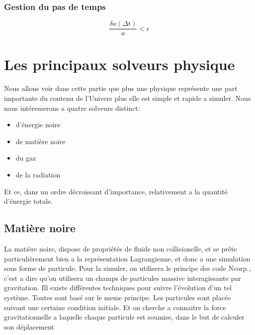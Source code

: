 \subsection{Gestion du pas de temps}


\begin{equation}
\frac{\delta a (\Delta t) } {a} < \epsilon
\end{equation}


\chapter{Les principaux solveurs physique}

Nous allons voir dans cette partie que plus une physique représente une part importante du contenu de l'Univers plus elle est simple et rapide a simuler.
Nous nous intéresserons a quatre solveurs distinct:
\begin{itemize}
\item d'énergie noire
\item de matière noire
\item du gaz
\item de la radiation
\end{itemize}
Et ce, dans un ordre décroissant d'importance, relativement a la quantité d'énergie totale.





\section{Matière noire}
\label{sec:solverDM}
La matière noire, dispose de propriétés de fluide non collisionelle, et se prête particulièrement bien a la représentation Lagrangienne, et donc a une simulation sous forme de particule.
Pour la simuler, on utilisera le principe des code Ncorp., c'est a dire qu'on utilisera un champs de particules massive interagissante par gravitation.
Ill existe différentes techniques pour suivre l'évolution d'un tel système.
Toutes sont basé sur le meme principe.
Les particules sont placée suivant une certaine condition initiale.
Et on cherche a connaitre la force gravitationnelle a laquelle chaque particule est soumise, dans le but de calculer son déplacement


